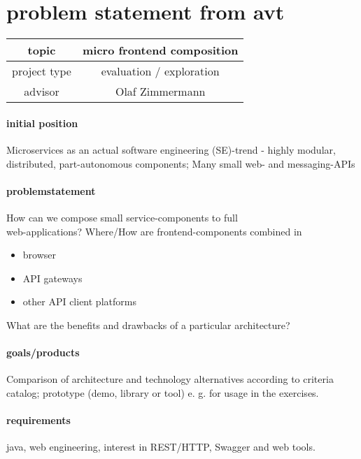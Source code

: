 
\section{problem statement from avt}

\begin{tabular}{| c | c |}
    \hline
    topic & micro frontend composition \\\hline
    project type & evaluation / exploration \\\hline
    advisor & Olaf Zimmermann \\\hline
\end{tabular}

\paragraph{initial position} Microservices as an actual software engineering (SE)-trend - highly modular, distributed, part-autonomous components; Many small web- and messaging-APIs
\paragraph{problemstatement} 
How can we compose small service-components to full \\web-applications? Where/How are frontend-components combined in
\begin{itemize}
    \item browser
    \item API gateways
    \item other API client platforms
\end{itemize}

What are the benefits and drawbacks of a particular architecture?

\paragraph{goals/products} Comparison of architecture and technology alternatives according
to criteria catalog; prototype (demo, library or tool) e. g. for usage in the exercises.

\paragraph{requirements} java, web engineering, interest in REST/HTTP, Swagger and web tools.